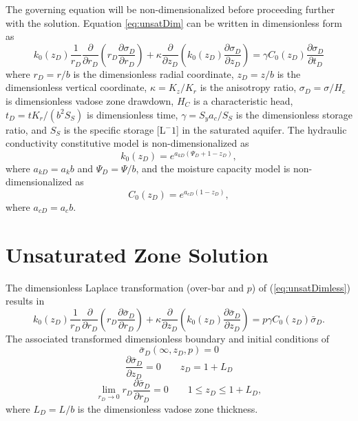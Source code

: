 \documentclass[12pt,letterpaper]{article}
\begin{document}
The governing equation will be non-dimensionalized before proceeding further with the solution. Equation \eqref{eq:unsatDim} can be written in dimensionless form as
\begin{equation}
  \label{eq:unsatDimless}
  k_0(z_D) \frac{1}{r_D} \frac{\partial}{\partial r_D} \left( r_D\frac{\partial \sigma_D}{\partial r_D} \right) + \kappa \frac{\partial}{\partial z_D} \left( k_0(z_D) \frac{\partial \sigma_D}{\partial z_D}\right) = \gamma C_0(z_D) \frac{\partial \sigma_D}{\partial t_D}
\end{equation}
where $r_D=r/b$ is the dimensionless radial coordinate, $z_D=z/b$ is the dimensionless vertical coordinate, $\kappa=K_z/K_r$ is the anisotropy ratio, $\sigma_D = \sigma/H_c$ is dimensionless vadose zone drawdown, $H_C$ is a characteristic head, $t_D = t K_r / (b^2 S_S)$ is dimensionless time, $\gamma = S_y a_c/S_S$ is the dimensionless storage ratio, and $S_S$ is the specific storage [L$^-1$] in the saturated aquifer.  The hydraulic conductivity constitutive model is non-dimensionalized as
\begin{equation}
  \label{eq:GardnerDimless}
 k_0(z_D)=e^{a_{kD} \left( \Psi_D + 1 - z_D \right)},
\end{equation}
where $a_{kD} = a_k b$ and $\Psi_D=\Psi/b$, and the moisture capacity model is non-dimensionalized as
\begin{equation}
  \label{eq:mrcDimless}
C_0(z_D) = e^{a_{cD} \left( 1-z_D\right)},
\end{equation}
where $a_{cD} = a_c b$.

\section{Unsaturated Zone Solution}
The dimensionless Laplace transformation (over-bar and $p$) of (\ref{eq:unsatDimless}) results in
\begin{equation}
  \label{eq:unsatLap}
   k_0(z_D) \frac{1}{r_D} \frac{\partial}{\partial r_D} \left( r_D\frac{\partial \bar{\sigma}_D}{\partial r_D} \right) +\kappa \frac{\partial}{\partial z_D} \left( k_0(z_D) \frac{\partial \bar{\sigma}_D}{\partial z_D}\right) = p \gamma C_0(z_D)  \bar{\sigma}_D.
\end{equation}
The associated transformed dimensionless boundary and initial conditions of
\begin{equation}\nonumber
 \bar{\sigma}_D(\infty,z_D,p) = 0
\end{equation}
\begin{equation}\nonumber
 \frac{\partial \bar{\sigma}_D}{\partial z_D}=0 \qquad z_D=1+L_D
\end{equation}
 \begin{equation}\nonumber
\lim_{r_D \rightarrow 0} r_D \frac{\partial \bar{\sigma}_D}{\partial r_D} = 0 \qquad 1\le z_D \le 1+L_D,
\end{equation}
where $L_D = L/b$ is the dimensionless vadose zone thickness.
\end{document}
